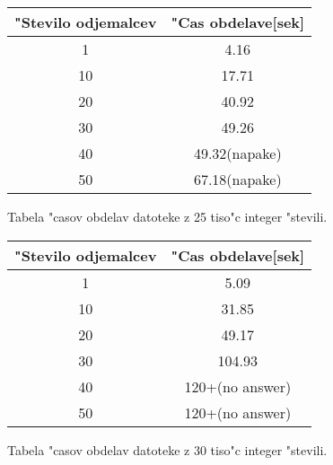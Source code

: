 \begin{figure}
  \centering
  \begin{tabular}{ | c | c | }
    \hline
    "Stevilo odjemalcev & "Cas obdelave[sek]\\ \hline
	1 & 4.16 \\ \hline
    10 & 17.71 \\ \hline
    20 & 40.92 \\ \hline
	30 & 49.26 \\ \hline
    40 & 49.32(napake) \\ \hline
    50 & 67.18(napake) \\ \hline
  \end{tabular}
  \caption{Tabela "casov obdelav datoteke z 25 tiso"c integer "stevili.}
  \label{8_table4}
  \centering
\end{figure}

\begin{figure}
  \centering
  \begin{tabular}{ | c | c | }
    \hline
    "Stevilo odjemalcev & "Cas obdelave[sek]\\ \hline
	1 & 5.09 \\ \hline
    10 & 31.85 \\ \hline
    20 & 49.17 \\ \hline
	30 & 104.93 \\ \hline
    40 & 120+(no answer) \\ \hline
    50 & 120+(no answer) \\ \hline
  \end{tabular}
  \caption{Tabela "casov obdelav datoteke z 30 tiso"c integer "stevili.}
  \label{8_table5}
  \centering
\end{figure}
